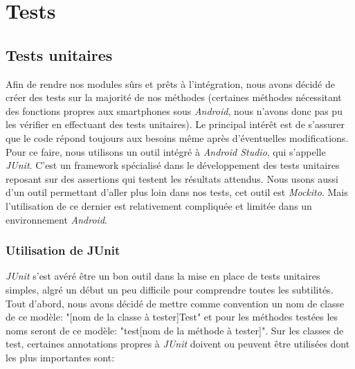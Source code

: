 \chapter{Tests}

\section{Tests unitaires}

Afin de rendre nos modules sûrs et prêts à l'intégration, nous avons décidé de créer des tests sur la majorité de nos méthodes (certaines méthodes nécessitant des fonctions propres aux smartphones sous \textit{Android}, nous n'avons donc pas pu les vérifier en effectuant des tests unitaires). Le principal intérêt est de s'assurer que le code répond toujours aux besoins même après d'éventuelles modifications. Pour ce faire, nous utilisons un outil intégré à \textit{Android Studio}, qui s'appelle \textit{JUnit}. C'est un framework spécialisé dans le développement des tests unitaires reposant sur des assertions qui testent les résultats attendus. Nous usons aussi d'un outil permettant d'aller plus loin dans nos tests, cet outil est \textit{Mockito}. Mais l'utilisation de ce dernier est relativement compliquée et limitée dans un environnement \textit{Android}.


\subsection{Utilisation de JUnit}

\textit{JUnit} s'est avéré être un bon outil dans la mise en place de tests unitaires simples, algré un début un peu difficile pour comprendre toutes les subtilités. Tout d'abord, nous avons décidé de mettre comme convention un nom de classe de ce modèle: "[nom de la classe à tester]Test" et pour les méthodes testées les noms seront de ce modèle: "test[nom de la méthode à tester]". Sur les classes de test, certaines annotations propres à \textit{JUnit} doivent ou peuvent être utilisées dont les plus importantes sont:\\

